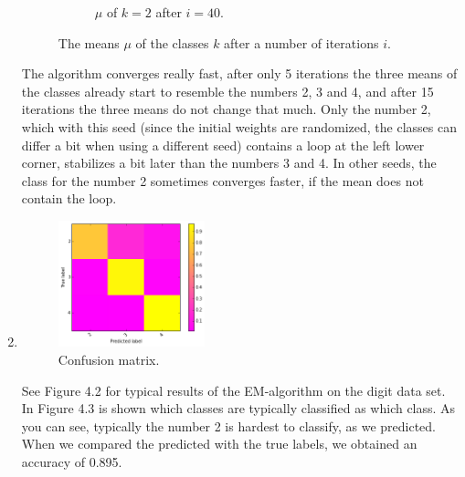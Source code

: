 \documentclass[a4paper,10pt]{article}
\numberwithin{equation}{section} %
\numberwithin{figure}{section} %
\numberwithin{table}{section} %
\theoremstyle{mytheor}
\begin{document}
\begin{enumerate}
\begin{figure}[h!]
\begin{subfigure}[b]{0.26\textwidth}
				\caption{$\mu$ of $k=2$ after $i=40$.}
			\end{subfigure}
   			\caption{\vspace{-0.1cm} The means $\mu$ of the classes $k$ after a number of iterations $i$.}\vspace{-0.2cm}
  		\end{figure}
		The algorithm converges really fast, after only 5 iterations the three means of the classes already start to resemble the numbers 2, 3 and 4, and after 15 iterations the three means do not change that much. Only the number 2, which with this seed (since the initial weights are randomized, the classes can differ a bit when using a different seed) contains a loop at the left lower corner, stabilizes a bit later than the numbers 3 and 4. In other seeds, the class for the number 2 sometimes converges faster, if the mean does not contain the loop.
	\item \begin{figure}[h!]
   			\centering
   			\includegraphics[width=0.4\textwidth]{digits/confusion.png}\vspace{-0.4cm}
   			\caption{\vspace{-0.1cm} Confusion matrix.}\vspace{-0.2cm}
  		\end{figure}
		See Figure 4.2 for typical results of the EM-algorithm on the digit data set. In Figure 4.3 is shown which classes are typically classified as which class. As you can see, typically the number 2 is hardest to classify, as we predicted. When we compared the predicted with the true labels, we obtained an accuracy of 0.895. 


\end{enumerate}
\end{document}
